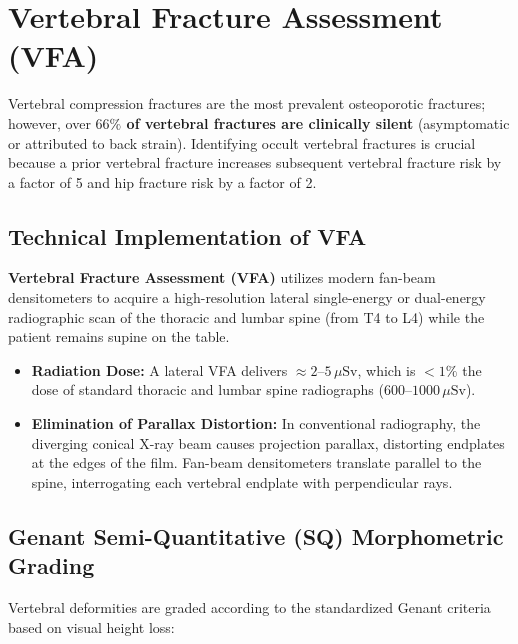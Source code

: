 \documentclass[11pt,a4paper]{article}
\begin{document}
\newpage
\section{Vertebral Fracture Assessment (VFA)}

Vertebral compression fractures are the most prevalent osteoporotic fractures; however, over \textbf{$66\%$ of vertebral fractures are clinically silent} (asymptomatic or attributed to back strain). Identifying occult vertebral fractures is crucial because a prior vertebral fracture increases subsequent vertebral fracture risk by a factor of 5 and hip fracture risk by a factor of 2.

\subsection{Technical Implementation of VFA}

\textbf{Vertebral Fracture Assessment (VFA)} utilizes modern fan-beam densitometers to acquire a high-resolution lateral single-energy or dual-energy radiographic scan of the thoracic and lumbar spine (from T4 to L4) while the patient remains supine on the table.
\begin{itemize}[leftmargin=*]
    \item \textbf{Radiation Dose:} A lateral VFA delivers $\approx 2\text{--}5\,\mu\text{Sv}$, which is $< 1\%$ the dose of standard thoracic and lumbar spine radiographs ($600\text{--}1000\,\mu\text{Sv}$).
    \item \textbf{Elimination of Parallax Distortion:} In conventional radiography, the diverging conical X-ray beam causes projection parallax, distorting endplates at the edges of the film. Fan-beam densitometers translate parallel to the spine, interrogating each vertebral endplate with perpendicular rays.
\end{itemize}

\subsection{Genant Semi-Quantitative (SQ) Morphometric Grading}

Vertebral deformities are graded according to the standardized Genant criteria based on visual height loss:
\end{document}
